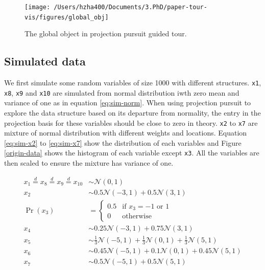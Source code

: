 \documentclass[12pt]{article}
\begin{document}
\begin{figure}
\texttt{[image: /Users/hzha400/Documents/3.PhD/paper-tour-vis/figures/global\_obj]} \caption{\label{glb-obj}The global object in projection pursuit guided tour.}\label{fig:glb-obj}
\end{figure}

\hypertarget{simulated-data}{%
\subsection{Simulated data}\label{simulated-data}}

We first simulate some random variables of size 1000 with different
structures. \texttt{x1}, \texttt{x8}, \texttt{x9} and \texttt{x10} are
simulated from normal distribution iwth zero mean and variance of one as
in equation \ref{eq:sim-norm}. When using projection pursuit to explore
the data structure based on its departure from normality, the entry in
the projection basis for these variables should be close to zero in
theory. \texttt{x2} to \texttt{x7} are mixture of normal distribution
with different weights and locations. Equation \ref{eq:sim-x2} to
\ref{eq:sim-x7} show the distribution of each variables and Figure
\ref{origin-data} shows the histogram of each variable except
\texttt{x3}. All the variables are then scaled to ensure the mixture has
variance of one.

\begin{align}
x_1 \overset{d}{=} x_8 \overset{d}{=} x_9 \overset{d}{=} x_{10}& \sim \mathcal{N}(0, 1) \label{eq:sim-norm} \\
x_2 &\sim 0.5 \mathcal{N}(-3, 1) + 0.5 \mathcal{N}(3, 1)\label{eq:sim-x2}\\
\Pr(x_3) &= 
\begin{cases}
0.5 & \text{if $x_3 = -1$ or $1$}\\
0 & \text{otherwise}
\end{cases}\label{eq:sim-x3}\\
x_4 &\sim 0.25 \mathcal{N}(-3, 1) + 0.75 \mathcal{N}(3, 1) \label{eq:sim-x4}\\
x_5 &\sim \frac{1}{3} \mathcal{N}(-5, 1) + \frac{1}{3} \mathcal{N}(0, 1) + \frac{1}{3} \mathcal{N}(5, 1)\label{eq:sim-x5}\\
x_6 &\sim 0.45 \mathcal{N}(-5, 1) + 0.1 \mathcal{N}(0, 1) + 0.45 \mathcal{N}(5, 1)\label{eq:sim-x6}\\
x_7 &\sim 0.5 \mathcal{N}(-5, 1) + 0.5 \mathcal{N}(5, 1) 
\label{eq:sim-x7}
\end{align}
\end{document}
